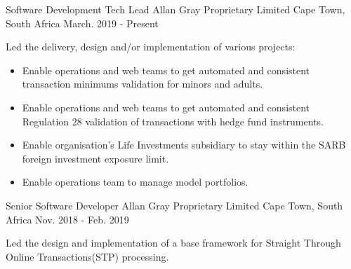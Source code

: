 

\begin{cventries}
  \cventry
    {Software Development Tech Lead} %
    {Allan Gray Proprietary Limited} %
    {Cape Town, South Africa} %
    {March. 2019 - Present} %
    {
      \begin{cvitems} %
        \item {Led the delivery, design and/or implementation of various projects:}  
        \begin{itemize}
          \item {Enable operations and web teams to get automated and consistent transaction minimums validation for minors and adults.}
          \item {Enable operations and web teams to get automated and consistent Regulation 28 validation of transactions with hedge fund instruments.}
          \item {Enable organisation's Life Investments subsidiary to stay within the SARB foreign investment exposure limit.}
          \item {Enable operations team to manage model portfolios.}
        \end{itemize}
      \end{cvitems}
    }

  \cventry
    {Senior Software Developer} %
    {Allan Gray Proprietary Limited} %
    {Cape Town, South Africa} %
    {Nov. 2018 - Feb. 2019} %
    {
      \begin{cvitems} %
        \item {Led the design and implementation of a base framework for Straight Through Online Transactions(STP) processing.}
      \end{cvitems}
    }


\end{cventries}
